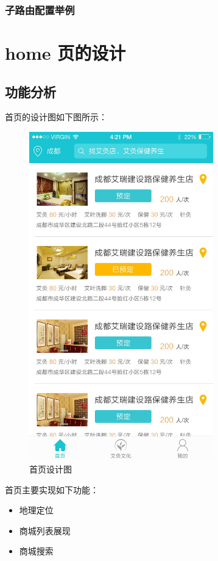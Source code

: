 \documentclass[UTF8]{ctexbook}
\begin{document}
      \subsubsection{子路由配置举例}
        \label{subsubsec:子路由配置举例}

  \section{home 页的设计}
    \label{sec:home_页的设计}

    \subsection{功能分析}
      \label{subsec:功能分析}
      首页的设计图如下图所示：
      \begin{figure}[H]
        \centering
        \includegraphics[width=8cm]{img/201705181050.jpg}
        \caption{首页设计图}
        \label{fig:home}
      \end{figure}
      首页主要实现如下功能：
      \begin{itemize}
        \item 地理定位
        \item 商城列表展现
        \item 商城搜索
      \end{itemize}
\end{document}
